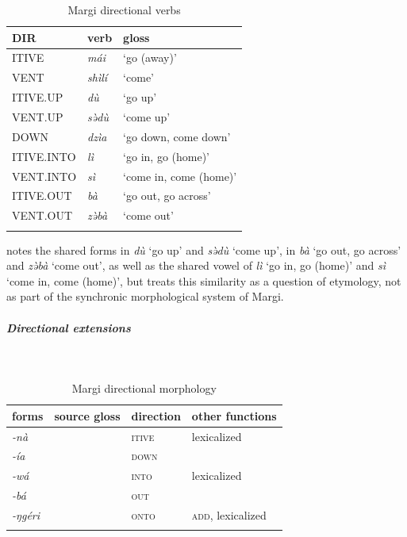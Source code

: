 \begin{table}[H]
	\caption{Margi directional verbs} 
	\label{tab:margV}
	\begin{tabular}{lll} %
		\lsptoprule
		DIR & verb & gloss   \\ %
		\midrule
		ITIVE & \textit{mái} & `go (away)' \\
		VENT & \textit{shìlí} & `come' \\
		ITIVE.UP & \textit{dù} & `go up' \\
		VENT.UP & \textit{sə̀dù} & `come up' \\
		DOWN & \textit{dzìa} & `go down, come down' \\
		ITIVE.INTO & \textit{lì} & `go in, go (home)' \\
		VENT.INTO & \textit{sì} & `come in, come (home)' \\
		ITIVE.OUT & \textit{bà} & `go out, go across' \\
		VENT.OUT & \textit{zə̀bà} & `come out' \\ 
		\lspbottomrule
	\end{tabular}
\end{table}

\citet[124, 149]{hoffmannGrammarMargiLanguage1963} notes the shared forms in \textit{dù} `go up' and \textit{sə̀dù} `come up', in \textit{bà} `go out, go across'  and \textit{zə̀bà} `come out', as well as the shared vowel of \textit{lì} `go in, go (home)' and \textit{sì} `come in, come (home)', but treats this similarity as a question of etymology, not as part of the synchronic morphological system of Margi. 

\newpage
\subparagraph{Directional extensions}~

\begin{table}[H]
	\caption{Margi directional morphology}
	\label{tab:marg}
	\begin{tabular}{llll} %
		\lsptoprule
		forms &  source gloss & direction  & other functions  \\ %
		\midrule
		\textit{-nà}  &  & \textsc{itive}  &  lexicalized  \\
		\textit{-ía}  &   &   \textsc{down}  &    \\
		\textit{-wá}  &    & \textsc{into}   &  lexicalized  \\		
		\textit{-bá}  &   &  \textsc{out}  &  \\
		\textit{-ŋgéri}  &    &  \textsc{onto}  &  \textsc{add}, lexicalized  \\
		\lspbottomrule
	\end{tabular}
\end{table} 

